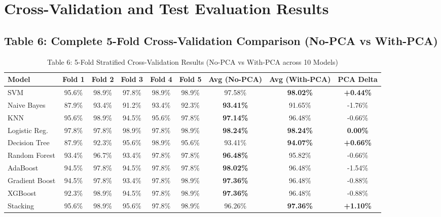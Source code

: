 \documentclass[12pt,a4paper]{article}
\begin{document}
\section{Cross-Validation and Test Evaluation Results}

\subsection*{Table 6: Complete 5-Fold Cross-Validation Comparison (No-PCA vs With-PCA)}
\begin{table}[H]
\centering
\small
\begin{tabular}{|l|ccccc|c|c|c|}
\hline
\textbf{Model} & \textbf{Fold 1} & \textbf{Fold 2} & \textbf{Fold 3} & \textbf{Fold 4} & \textbf{Fold 5} & \textbf{Avg (No-PCA)} & \textbf{Avg (With-PCA)} & \textbf{PCA Delta} \\ \hline
SVM & 95.6\% & 98.9\% & 97.8\% & 98.9\% & 98.9\% & 97.58\% & \textbf{98.02\%} & \textbf{+0.44\%} \\ \hline
Naive Bayes & 87.9\% & 93.4\% & 91.2\% & 93.4\% & 92.3\% & \textbf{93.41\%} & 91.65\% & -1.76\% \\ \hline
KNN & 95.6\% & 98.9\% & 94.5\% & 95.6\% & 97.8\% & \textbf{97.14\%} & 96.48\% & -0.66\% \\ \hline
Logistic Reg. & 97.8\% & 97.8\% & 98.9\% & 97.8\% & 98.9\% & \textbf{98.24\%} & \textbf{98.24\%} & \textbf{0.00\%} \\ \hline
Decision Tree & 87.9\% & 92.3\% & 95.6\% & 98.9\% & 95.6\% & 93.41\% & \textbf{94.07\%} & \textbf{+0.66\%} \\ \hline
Random Forest & 93.4\% & 96.7\% & 93.4\% & 97.8\% & 97.8\% & \textbf{96.48\%} & 95.82\% & -0.66\% \\ \hline
AdaBoost & 94.5\% & 97.8\% & 94.5\% & 97.8\% & 97.8\% & \textbf{98.02\%} & 96.48\% & -1.54\% \\ \hline
Gradient Boost & 94.5\% & 97.8\% & 93.4\% & 97.8\% & 98.9\% & \textbf{97.36\%} & 96.48\% & -0.88\% \\ \hline
XGBoost & 92.3\% & 98.9\% & 94.5\% & 97.8\% & 98.9\% & \textbf{97.36\%} & 96.48\% & -0.88\% \\ \hline
Stacking & 95.6\% & 98.9\% & 95.6\% & 97.8\% & 98.9\% & 96.26\% & \textbf{97.36\%} & \textbf{+1.10\%} \\ \hline
\end{tabular}
\caption{Table 6: 5-Fold Stratified Cross-Validation Results (No-PCA vs With-PCA across 10 Models)}
\label{tab:exp7_cv_results}
\end{table}
\end{document}
